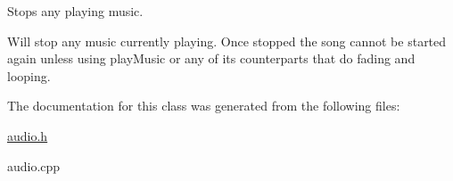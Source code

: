 Stops any playing music. 

Will stop any music currently playing. Once stopped the song cannot be started again unless using playMusic or any of its counterparts that do fading and looping. 

The documentation for this class was generated from the following files:\begin{CompactItemize}
\item 
\hyperlink{audio_8h}{audio.h}\item 
audio.cpp\end{CompactItemize}
